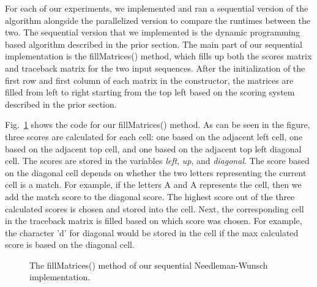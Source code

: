 \documentclass[conference]{IEEEtran}
\begin{document}
For each of our experiments, we implemented and ran a sequential version of the algorithm alongside the parallelized version to compare the runtimes between the two. The sequential version that we implemented is the dynamic programming based algorithm described in the prior section. The main part of our sequential implementation is the fillMatrices() method, which fills up both the scores matrix and traceback matrix for the two input sequences. After the initialization of the first row and first column of each matrix in the constructor, the matrices are filled from left to right starting from the top left based on the scoring system described in the prior section.

Fig.~\ref{9} shows the code for our fillMatrices() method. As can be seen in the figure, three scores are calculated for each cell: one based on the adjacent left cell, one based on the adjacent top cell, and one based on the adjacent top left diagonal cell. The scores are stored in the variables \emph{left}, \emph{up}, and \emph{diagonal}. The score based on the diagonal cell depends on whether the two letters representing the current cell is a match. For example, if the letters A and A represents the cell, then we add the match score to the diagonal score. The highest score out of the three calculated scores is chosen and stored into the cell. Next, the corresponding cell in the traceback matrix is filled based on which score was chosen. For example, the character 'd' for diagonal would be stored in the cell if the max calculated score is based on the diagonal cell.

\begin{figure}[htbp]
\centerline{}
\caption{The fillMatrices() method of our sequential Needleman-Wunsch implementation.}
\label{9}
\end{figure}
\end{document}
